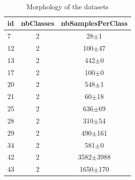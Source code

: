   
\begin{table} 
\begin{center} 
\ 
 \setlength{\tabcolsep}{.16667em} 
\begin{tabular}{lcc} 
id & nbClasses & nbSamplesPerClass \\ 
\hline 
 7 & 2 &      28$\pm$1 \\ 
12 & 2 &    100$\pm$47 \\ 
13 & 2 &     442$\pm$0 \\ 
17 & 2 &     100$\pm$0 \\ 
20 & 2 &     548$\pm$1 \\ 
21 & 2 &     60$\pm$18 \\ 
25 & 2 &    636$\pm$69 \\ 
28 & 2 &    310$\pm$54 \\ 
29 & 2 &   490$\pm$161 \\ 
34 & 2 &     581$\pm$0 \\ 
42 & 2 & 3582$\pm$3988 \\ 
43 & 2 &  1650$\pm$170 \\ 
\end{tabular} 
\end{center} 
\caption{Morphology of the datasets} 
\label{didtNoda1} 
\end{table} 
 
